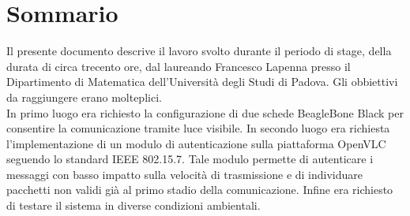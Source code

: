 \cleardoublepage
{}
{}
\begingroup
\let\clearpage\relax
\let\cleardoublepage\relax
\let\cleardoublepage\relax

\chapter*{Sommario}

Il presente documento descrive il lavoro svolto durante il periodo di stage, della durata di circa trecento ore, dal laureando Francesco Lapenna presso il Dipartimento di Matematica dell'Università degli Studi di Padova.
Gli obbiettivi da raggiungere erano molteplici.\\
In primo luogo era richiesto la configurazione di due schede BeagleBone Black per consentire la comunicazione tramite luce visibile.
In secondo luogo era richiesta l'implementazione di un modulo di autenticazione sulla piattaforma OpenVLC seguendo lo standard IEEE 802.15.7.
Tale modulo permette di autenticare i messaggi con basso impatto sulla velocità di trasmissione e di individuare pacchetti non validi già al primo stadio della comunicazione.
Infine era richiesto di testare il sistema in diverse condizioni ambientali.




\endgroup

\vfill
